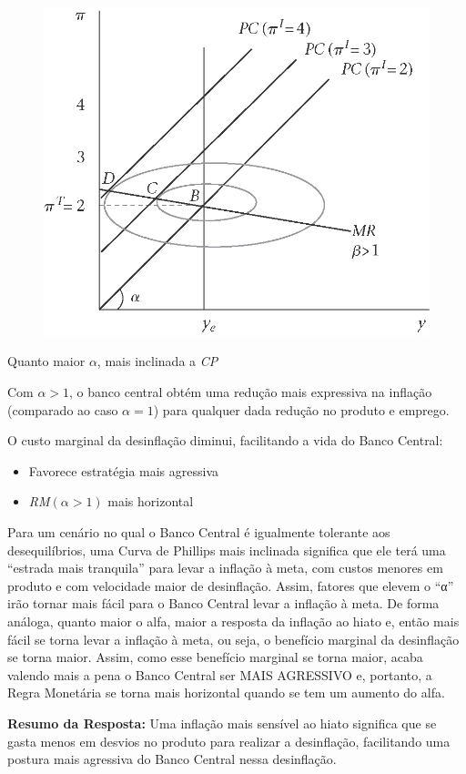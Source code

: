 \documentclass[a4paper,12pt]{article}[abntex2]
\begin{document}
\begin{figure}[H]
    \centering
    \includegraphics[width=0.7\linewidth]{Imagens/a15i8.png}
\end{figure}


Quanto maior $\alpha$, mais inclinada a \textit{CP}

Com $\alpha > 1$, o banco central obtém uma redução mais expressiva na inflação (comparado ao caso $\alpha = 1$) para qualquer dada redução no produto e emprego.

O custo marginal da desinflação diminui, facilitando a vida do Banco Central:\begin{itemize}
    \item Favorece estratégia mais agressiva
    \item \textit{RM}$(\alpha > 1)$ mais horizontal
\end{itemize}

Para um cenário no qual o Banco Central é igualmente tolerante aos desequilíbrios, uma Curva de Phillips mais inclinada significa que ele terá uma “estrada mais tranquila” para levar a inflação à meta, com custos menores em produto e com velocidade maior de desinflação. Assim, fatores que elevem o “α” irão tornar mais fácil para o Banco Central levar a inflação à meta. De forma análoga, quanto maior o alfa, maior a resposta da inflação ao hiato e, então mais fácil se torna levar a inflação à meta, ou seja, o benefício marginal da desinflação se torna maior. Assim, como esse benefício marginal se torna maior, acaba valendo mais a pena o Banco Central ser MAIS AGRESSIVO e, portanto, a Regra Monetária se torna mais horizontal quando se tem um aumento do alfa. 

\textbf{Resumo da Resposta:} Uma inflação mais sensível ao hiato significa que se gasta menos em desvios no produto para realizar a desinflação, facilitando uma postura mais agressiva do Banco Central nessa desinflação.  
\end{document}
